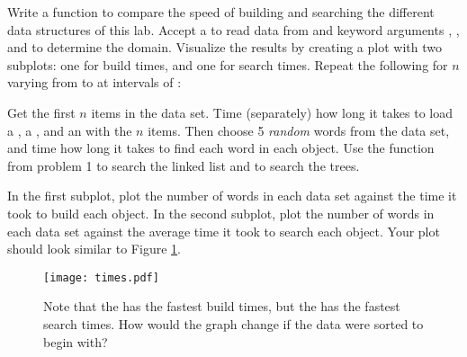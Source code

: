 \begin{problem}
Write a function to compare the speed of building and searching the different data structures of this lab.
Accept a  to read data from and keyword arguments , , and  to determine the domain.
Visualize the results by creating a plot with two subplots: one for build times, and one for search times.
Repeat the following for $n$ varying from  to  at intervals of :

Get the first $n$ items in the data set.
Time (separately) how long it takes to load a , a , and an  with the $n$ items.
Then choose 5 \emph{random} words from the data set, and time how long it takes to find each word in each object.
Use the  function from problem 1 to search the linked list and  to search the trees.

In the first subplot, plot the number of words in each data set against the time it took to build each object.
In the second subplot, plot the number of words in each data set against the average time it took to search each object.
Your plot should look similar to Figure \ref{fig:times}.

\begin{figure}[H]
\texttt{[image: times.pdf]}
\caption{Note that the  has the fastest build times, but the  has the fastest search times. How would the graph change if the data were sorted to begin with?}
\label{fig:times}
\end{figure}

\end{problem}

